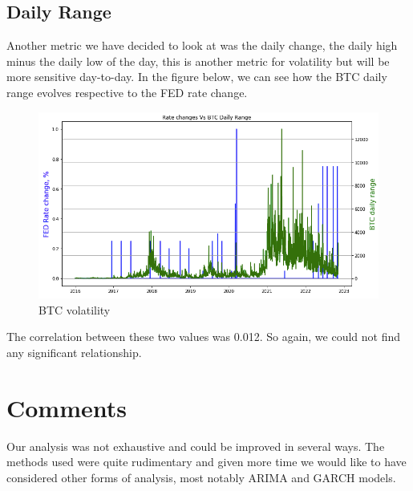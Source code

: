\documentclass[12pt]{article}
\begin{document}
\subsection{Daily Range}
Another metric we have decided to look at was the daily change, the daily high minus the daily low of the day, this is another metric for volatility but will be more sensitive day-to-day. 
\newline
In the figure below, we can see how the BTC daily range evolves respective to the FED rate change.
\begin{figure}[H]
   \includegraphics[width = \textwidth]{research_project/text/paper/range.png}
   \centering
   \caption{BTC volatility}
   \label{fig:range}
\end{figure}
The correlation between these two values was 0.012. So again, we could not find any significant relationship.
\newline
\section{Comments}
Our analysis was not exhaustive and could be improved in several ways. The methods used were quite rudimentary and given more time we would like to have considered other forms of analysis, most notably ARIMA and GARCH models.
\end{document}
